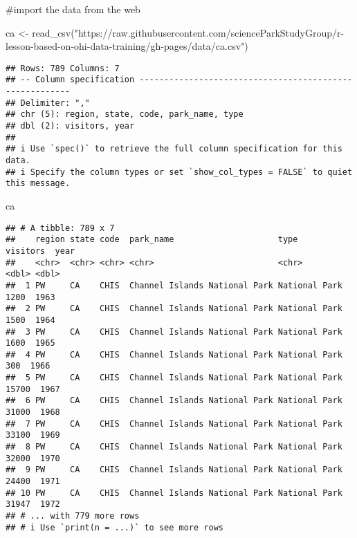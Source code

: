 \documentclass[
]{article}
\newenvironment{Shaded}{\begin{snugshade}}{\end{snugshade}}
\newcommand{\FunctionTok}[1]{\textcolor[rgb]{0.00,0.00,0.00}{#1}}
\newcommand{\NormalTok}[1]{#1}
\newcommand{\OtherTok}[1]{\textcolor[rgb]{0.56,0.35,0.01}{#1}}
\newcommand{\StringTok}[1]{\textcolor[rgb]{0.31,0.60,0.02}{#1}}
\begin{document}
\#import the data from the web

\begin{Shaded}
\begin{Highlighting}[]
\NormalTok{ca }\OtherTok{\textless{}{-}} \FunctionTok{read\_csv}\NormalTok{(}\StringTok{"https://raw.githubusercontent.com/scienceParkStudyGroup/r{-}lesson{-}based{-}on{-}ohi{-}data{-}training/gh{-}pages/data/ca.csv"}\NormalTok{)}
\end{Highlighting}
\end{Shaded}

\begin{verbatim}
## Rows: 789 Columns: 7
## -- Column specification --------------------------------------------------------
## Delimiter: ","
## chr (5): region, state, code, park_name, type
## dbl (2): visitors, year
## 
## i Use `spec()` to retrieve the full column specification for this data.
## i Specify the column types or set `show_col_types = FALSE` to quiet this message.
\end{verbatim}

\begin{Shaded}
\begin{Highlighting}[]
\NormalTok{ca}
\end{Highlighting}
\end{Shaded}

\begin{verbatim}
## # A tibble: 789 x 7
##    region state code  park_name                     type          visitors  year
##    <chr>  <chr> <chr> <chr>                         <chr>            <dbl> <dbl>
##  1 PW     CA    CHIS  Channel Islands National Park National Park     1200  1963
##  2 PW     CA    CHIS  Channel Islands National Park National Park     1500  1964
##  3 PW     CA    CHIS  Channel Islands National Park National Park     1600  1965
##  4 PW     CA    CHIS  Channel Islands National Park National Park      300  1966
##  5 PW     CA    CHIS  Channel Islands National Park National Park    15700  1967
##  6 PW     CA    CHIS  Channel Islands National Park National Park    31000  1968
##  7 PW     CA    CHIS  Channel Islands National Park National Park    33100  1969
##  8 PW     CA    CHIS  Channel Islands National Park National Park    32000  1970
##  9 PW     CA    CHIS  Channel Islands National Park National Park    24400  1971
## 10 PW     CA    CHIS  Channel Islands National Park National Park    31947  1972
## # ... with 779 more rows
## # i Use `print(n = ...)` to see more rows
\end{verbatim}
\end{document}

